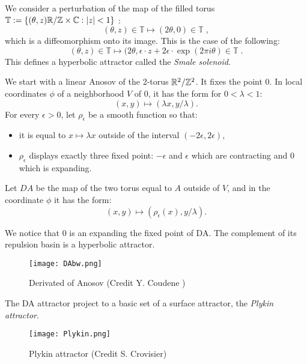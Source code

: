 \documentclass[11pt,openany,leqno]{article}
\begin{document}
\begin{exam}
We consider a perturbation of the map of the filled torus 
$\mathbb T := \{(\theta, z)\mathbb R/\mathbb Z \times \mathbb C: |z|<1\}$ 
:
\[(\theta, z)\in \mathbb T \mapsto (2\theta, 0)\in  \mathbb T \;,\]
which is a diffeomorphism onto its image. This is the case of the following:  
\[(\theta, z)\in \mathbb T \mapsto (2\theta, \epsilon \cdot z+ 2\epsilon\cdot  \exp(2\pi i \theta )\in  \mathbb T \;.\]
This defines a hyperbolic attractor called the \emph{Smale solenoid}.
\end{exam}
\vspace{1cm}
\begin{exam}
We start with a linear Anosov of the 2-torus $\mathbb R^2/\mathbb Z^2$. It fixes the point 0.  In local coordinates $\phi$ of a neighborhood $V$ of $0$, it has the form for $0<\lambda<1$:
$$(x,y)\mapsto (\lambda x, y/\lambda).$$ 
For every $\epsilon>0$, let $\rho_\epsilon$ be a smooth function 
so that: 
\begin{itemize}
\item it is equal to $x\mapsto \lambda x$ outside of the interval $(-2\epsilon, 2\epsilon)$,
\item $\rho_\epsilon$ displays exactly three fixed point: $-\epsilon$ and $\epsilon$ which are contracting and  $0$ which is expanding. 
\end{itemize}
Let $DA$ be the map of the two torus equal to $A$ outside of $V$, and in the coordinate $\phi$ it has the form:
 $$(x,y)\mapsto (\rho_\epsilon( x), y/\lambda).$$ 

We notice that $0$ is an expanding the fixed point of DA. The complement of its repulsion basin is a hyperbolic attractor. 
   
\begin{figure}[h!]
	\centering
		\texttt{[image: DAbw.png]}
	\caption{Derivated of Anosov (Credit Y. Coudene \cite{Co06})}
\end{figure}

The DA attractor project to a basic set of a surface attractor, the \emph{Plykin attractor}. 

\begin{figure}[h!]
	\centering
		\texttt{[image: Plykin.png]}
	\caption{Plykin attractor (Credit S. Crovisier)}
\end{figure}
\end{exam}
\end{document}
